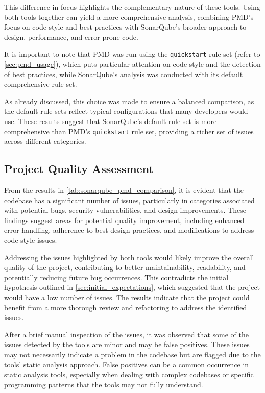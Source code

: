 This difference in focus highlights the complementary nature of these tools. Using both tools together can yield a more comprehensive analysis, combining PMD's focus on code style and best practices with SonarQube's broader approach to design, performance, and error-prone code.

It is important to note that PMD was run using the \texttt{quickstart} rule set (refer to \autoref{sec:pmd_usage}), which puts particular attention on code style and the detection of best practices, while SonarQube’s analysis was conducted with its default comprehensive rule set.

As already discussed, this choice was made to ensure a balanced comparison, as the default rule sets reflect typical configurations that many developers would use. These results suggest that SonarQube’s default rule set is more comprehensive than PMD’s \texttt{quickstart} rule set, providing a richer set of issues across different categories.

\subsection{Project Quality Assessment}

From the results in \autoref{tab:sonarqube_pmd_comparison}, it is evident that the codebase has a significant number of issues, particularly in categories associated with potential bugs, security vulnerabilities, and design improvements. These findings suggest areas for potential quality improvement, including enhanced error handling, adherence to best design practices, and modifications to address code style issues.

Addressing the issues highlighted by both tools would likely improve the overall quality of the project, contributing to better maintainability, readability, and potentially reducing future bug occurrences. This contradicts the initial hypothesis outlined in \autoref{sec:initial_expectations}, which suggested that the project would have a low number of issues. The results indicate that the project could benefit from a more thorough review and refactoring to address the identified issues.

After a brief manual inspection of the issues, it was observed that some of the issues detected by the tools are minor and may be false positives. These issues may not necessarily indicate a problem in the codebase but are flagged due to the tools' static analysis approach. False positives can be a common occurrence in static analysis tools, especially when dealing with complex codebases or specific programming patterns that the tools may not fully understand.

